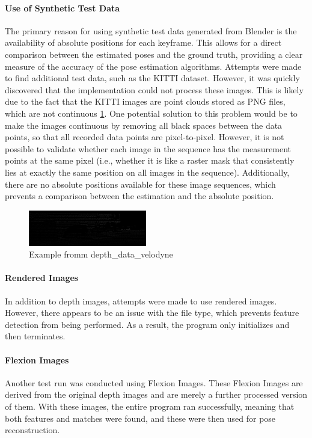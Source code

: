 \documentclass[conference, a4paper]{IEEEtran}
\begin{document}
\paragraph{Use of Synthetic Test Data}
The primary reason for using synthetic test data generated from Blender is the availability of absolute positions for each keyframe. This allows for a direct comparison between the estimated poses and the ground truth, providing a clear measure of the accuracy of the pose estimation algorithms. Attempts were made to find additional test data, such as the KITTI dataset. However, it was quickly discovered that the implementation could not process these images. This is likely due to the fact that the KITTI images are point clouds stored as PNG files, which are not continuous \ref{Pic1}. One potential solution to this problem would be to make the images continuous by removing all black spaces between the data points, so that all recorded data points are pixel-to-pixel. However, it is not possible to validate whether each image in the sequence has the measurement points at the same pixel (i.e., whether it is like a raster mask that consistently lies at exactly the same position on all images in the sequence). Additionally, there are no absolute positions available for these image sequences, which prevents a comparison between the estimation and the absolute position.
\begin{figure}[h]
	\centering
	\includegraphics[width=0.46\textwidth]{pics/kitti_cropped.png}
	\caption{Example fromm depth\_data\_velodyne\cite{kitti_dataset}}
	\label{Pic1}
\end{figure}

\paragraph{Rendered Images}
In addition to depth images, attempts were made to use rendered images. However, there appears to be an issue with the file type, which prevents feature detection from being performed. As a result, the program only initializes and then terminates.

\paragraph{Flexion Images}
Another test run was conducted using Flexion Images. These Flexion Images are derived from the original depth images and are merely a further processed version of them. With these images, the entire program ran successfully, meaning that both features and matches were found, and these were then used for pose reconstruction.
\end{document}
